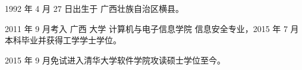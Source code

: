 \begin{resume}


  1992 年 4 月 27 日出生于 广西壮族自治区横县。

  2011 年 9 月考入 广西 大学 计算机与电子信息学院 信息安全专业，2015 年 7 月本科毕业并获得工学学士学位。

  2015 年 9 月免试进入清华大学软件学院攻读硕士学位至今。






\end{resume}
